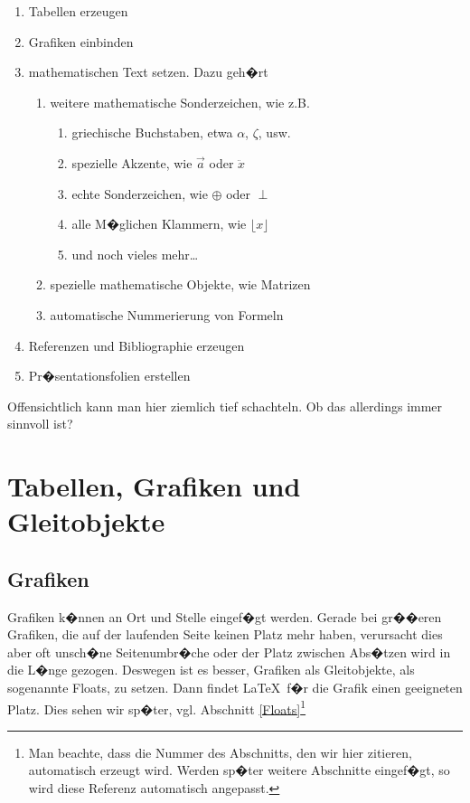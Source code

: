 \documentclass[11pt,a4paper]{article} %
\begin{document}
\begin{enumerate}
 \item Tabellen erzeugen
 \item Grafiken einbinden
 \item mathematischen Text setzen. Dazu geh�rt
    \begin{enumerate}
       \item weitere mathematische Sonderzeichen, wie z.B.
           \begin{enumerate}
               \item griechische Buchstaben, etwa $\alpha$, $\zeta$, usw.
               \item spezielle Akzente, wie $\vec{a}$ oder $\ddot{x}$
               \item echte Sonderzeichen, wie $\oplus$ oder $\perp$
               \item alle M�glichen Klammern, wie $\lfloor x \rfloor$
               \item und noch vieles mehr\ldots
           \end{enumerate}
       \item spezielle mathematische Objekte, wie Matrizen
       \item automatische Nummerierung von Formeln
    \end{enumerate}
 \item Referenzen und Bibliographie erzeugen
 \item Pr�sentationsfolien erstellen
\end{enumerate}

Offensichtlich kann man hier ziemlich tief schachteln. Ob das allerdings immer sinnvoll ist?



\section{Tabellen, Grafiken und Gleitobjekte}
\label{TabellenGrafikenFloats}


\subsection{Grafiken}
\label{Grafiken}

Grafiken k�nnen an Ort und Stelle eingef�gt werden. Gerade bei gr��eren Grafiken, die auf der laufenden Seite keinen Platz mehr haben, verursacht dies aber oft unsch�ne Seitenumbr�che oder der Platz zwischen Abs�tzen wird in die L�nge gezogen. Deswegen ist es besser, Grafiken als Gleitobjekte, als sogenannte \glqq Floats\grqq, zu setzen. Dann findet \LaTeX\ f�r die Grafik einen geeigneten Platz. Dies sehen wir sp�ter, vgl. Abschnitt \ref{Floats}\footnote{Man beachte, dass die Nummer des Abschnitts, den wir hier zitieren, automatisch erzeugt wird. Werden sp�ter weitere Abschnitte eingef�gt, so wird diese Referenz automatisch angepasst.}
\end{document}

